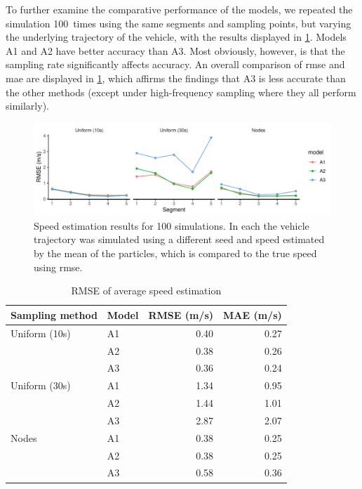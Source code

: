 To further examine the comparative performance of the models, we repeated the simulation 100~times using the same segments and sampling points, but varying the underlying trajectory of the vehicle, with the results displayed in \cref{fig:sim1_pf_full}. Models A1 and A2 have better accuracy than A3. Most obviously, however, is that the sampling rate significantly affects accuracy. An overall comparison of \gls{rmse} and \gls{mae} are displayed in \cref{tab:sim1_pf_full}, which affirms the findings that A3 is less accurate than the other methods  (except under high-frequency sampling where they all perform similarly).


\begin{knitrout}\small
{}\color{fgcolor}\begin{figure}
\includegraphics[width=\linewidth]{figure/sim1_pf_full-1} \caption[Results for simulation A replicated 100~times]{Speed estimation results for 100 simulations. In each the vehicle trajectory was simulated using a different seed and speed estimated by the mean of the particles, which is compared to the true speed using \gls{rmse}.}\label{fig:sim1_pf_full}
\end{figure}

\begin{table}

\caption{\label{tab:sim1_pf_full}RMSE of average speed estimation}
\centering
\fontsize{8}{10}\selectfont
\begin{tabular}[t]{llrr}
\toprule
Sampling method & Model & RMSE (m/s) & MAE (m/s)\\
\midrule
Uniform (10s) & A1 & 0.40 & 0.27\\
 & A2 & 0.38 & 0.26\\
 & A3 & 0.36 & 0.24\\
\midrule
Uniform (30s) & A1 & 1.34 & 0.95\\
 & A2 & 1.44 & 1.01\\
 & A3 & 2.87 & 2.07\\
\midrule
Nodes & A1 & 0.38 & 0.25\\
 & A2 & 0.38 & 0.25\\
 & A3 & 0.58 & 0.36\\
\bottomrule
\end{tabular}
\end{table}


\end{knitrout}



